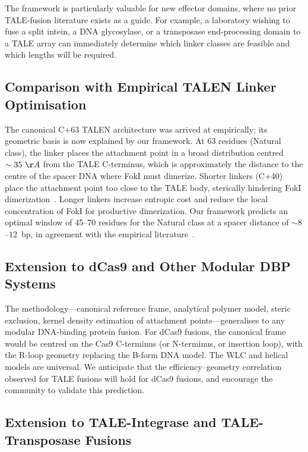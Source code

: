 \documentclass[11pt,a4paper]{article}
\newcommand{\angstrom}{\AA}
\begin{document}
The framework is particularly valuable for new effector domains, where no prior TALE-fusion
literature exists as a guide. For example, a laboratory wishing to fuse a split intein, a
DNA glycosylase, or a transposase end-processing domain to a TALE array can immediately
determine which linker classes are feasible and which lengths will be required.

\subsection{Comparison with Empirical TALEN Linker Optimisation}

The canonical C+63 TALEN architecture was arrived at empirically; its geometric basis is
now explained by our framework. At 63 residues (Natural class), the linker places the
attachment point in a broad distribution centred $\sim 35~\angstrom$ from the TALE
C-terminus, which is approximately the distance to the centre of the spacer DNA where
FokI must dimerize. Shorter linkers (C+40) place the attachment point too close to the
TALE body, sterically hindering FokI dimerization~\citep{Miller2011}. Longer linkers
increase entropic cost and reduce the local concentration of FokI for productive
dimerization. Our framework predicts an optimal window of 45--70 residues for the Natural
class at a spacer distance of $\sim 8$--$12$~bp, in agreement with the empirical
literature~\citep{Cermak2011}.

\subsection{Extension to dCas9 and Other Modular DBP Systems}

The methodology---canonical reference frame, analytical polymer model, steric exclusion,
kernel density estimation of attachment points---generalises to any modular DNA-binding
protein fusion. For dCas9 fusions, the canonical frame would be centred on the Cas9
C-terminus (or N-terminus, or insertion loop), with the R-loop geometry replacing the
B-form DNA model. The WLC and helical models are universal. We anticipate that the
efficiency--geometry correlation observed for TALE fusions will hold for dCas9 fusions,
and encourage the community to validate this prediction.

\subsection{Extension to TALE-Integrase and TALE-Transposase Fusions}
\end{document}
